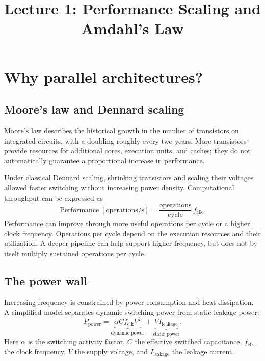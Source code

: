 \documentclass[11pt,a4paper]{article}
\title{Lecture 1: Performance Scaling and Amdahl's Law}
\author{}
\date{}
\begin{document}
\maketitle
\vspace{-2em}

\section{Why parallel architectures?}
\subsection{Moore's law and Dennard scaling}
Moore's law describes the historical growth in the number of transistors
on integrated circuits, with a doubling roughly every two years. More
transistors provide resources for additional cores, execution units, and caches;
they do not automatically guarantee a proportional increase in performance.

Under classical Dennard scaling, shrinking transistors and scaling their
voltages allowed faster switching without increasing power density.
Computational throughput can be expressed as
\begin{equation}
  \mathrm{Performance}\;[\mathrm{operations/s}]
  =\frac{\mathrm{operations}}{\mathrm{cycle}}\,f_{\mathrm{clk}}.
\end{equation}
Performance can improve through more useful operations per cycle or a higher
clock frequency. Operations per cycle depend on the execution resources and
their utilization. A deeper pipeline can help support higher frequency, but
does not by itself multiply sustained operations per cycle.

\subsection{The power wall}
Increasing frequency is constrained by power consumption and heat dissipation.
A simplified model separates dynamic switching power from static leakage power:
\begin{equation}
  \boxed{P_{\mathrm{power}}
  =\underbrace{\alpha C f_{\mathrm{clk}}V^2}_{\text{dynamic power}}
   +\underbrace{V I_{\mathrm{leakage}}}_{\text{static power}}.}
\end{equation}
Here $\alpha$ is the switching activity factor, $C$ the effective switched
capacitance, $f_{\mathrm{clk}}$ the clock frequency, $V$ the supply voltage,
and $I_{\mathrm{leakage}}$ the leakage current.
\end{document}
